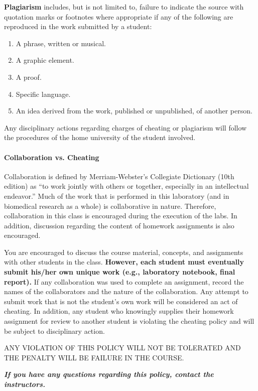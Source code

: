 \textbf{Plagiarism} includes, but is not limited to, failure to indicate the source with quotation marks or footnotes where appropriate if any of the following are reproduced in the work submitted by a student:
\begin{enumerate}
\item A phrase, written or musical.
\item A graphic element.
\item A proof.
\item Specific language.
\item An idea derived from the work, published or unpublished, of another person.
\end{enumerate}
Any disciplinary actions regarding charges of cheating or plagiarism will follow the procedures of the home university of the student involved.
 
\paragraph{Collaboration vs. Cheating}
Collaboration is defined by Merriam-Webster’s Collegiate Dictionary (10th edition) as 
“to work jointly with others or together, especially in an intellectual endeavor.” 
Much of the work that is performed in this laboratory (and in biomedical research as a whole) is collaborative in nature. 
Therefore, collaboration in this class is encouraged during the execution of the labs. 
In addition, discussion regarding the content of homework assignments is also encouraged.
 
You are encouraged to discuss the course material, concepts, and assignments with other students in the class. 
\textbf{However, each student must eventually submit his/her own unique work (e.g., laboratory notebook, final report). }
If any collaboration was used to complete an assignment, 
record the names of the collaborators and the nature of the collaboration. 
Any attempt to submit work that is not the student’s own work will be considered an act of cheating. 
In addition, any student who knowingly supplies their homework assignment for review 
to another student is violating the cheating policy and will be subject to disciplinary action.
 
 \begin{tcolorbox}[colback=red!5,colframe=red!75!black]
ANY VIOLATION OF THIS POLICY WILL NOT BE TOLERATED AND THE PENALTY WILL BE FAILURE IN THE COURSE.
\end{tcolorbox}
 
\textbf{\textit{If you have any questions regarding this policy, contact the instructors.}}

